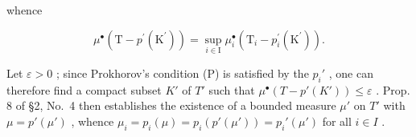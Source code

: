 whence

\[
\mu^ {\bullet} \left(\mathrm{T} - p ^ {\prime} \left(\mathrm{K} ^ {\prime}\right)\right) = \sup _ {i \in \mathrm{I}} \mu_ {i} ^ {\bullet} \left(\mathrm{T} _ {i} - p _ {i} ^ {\prime} \left(\mathrm{K} ^ {\prime}\right)\right).
\]

Let \(\varepsilon > 0\) ; since Prokhorov's condition (P) is satisfied by the \(p_i'\) , one can therefore find a compact subset \(K'\) of \(T'\) such that \(\mu^\bullet(T - p'(K')) \leqslant \varepsilon\) . Prop. 8 of §2, No.~4 then establishes the existence of a bounded measure \(\mu'\) on \(T'\) with \(\mu = p'(\mu')\) , whence \(\mu_i = p_i(\mu) = p_i(p'(\mu')) = p_i'(\mu')\) for all \(i \in I\) .

